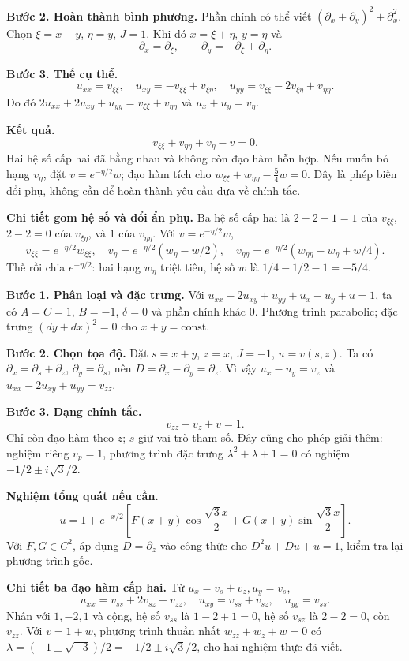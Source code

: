 \textbf{Bước 2. Hoàn thành bình phương.} Phần chính có thể viết $(\partial_x+\partial_y)^2+\partial_x^2$. Chọn $\xi=x-y$, $\eta=y$, $J=1$. Khi đó $x=\xi+\eta$, $y=\eta$ và
\[\partial_x=\partial_\xi,\qquad\partial_y=-\partial_\xi+\partial_\eta.\]

\textbf{Bước 3. Thế cụ thể.}
\[u_{xx}=v_{\xi\xi},\quad u_{xy}=-v_{\xi\xi}+v_{\xi\eta},\quad
u_{yy}=v_{\xi\xi}-2v_{\xi\eta}+v_{\eta\eta}.\]
Do đó $2u_{xx}+2u_{xy}+u_{yy}=v_{\xi\xi}+v_{\eta\eta}$ và $u_x+u_y=v_\eta$.

\textbf{Kết quả.}
\[\boxed{v_{\xi\xi}+v_{\eta\eta}+v_\eta-v=0.}\]
Hai hệ số cấp hai đã bằng nhau và không còn đạo hàm hỗn hợp. Nếu muốn bỏ hạng $v_\eta$, đặt $v=e^{-\eta/2}w$; đạo hàm tích cho $w_{\xi\xi}+w_{\eta\eta}-\tfrac54w=0$. Đây là phép biến đổi phụ, không cần để hoàn thành yêu cầu đưa về chính tắc.

\textbf{Chi tiết gom hệ số và đổi ẩn phụ.} Ba hệ số cấp hai là $2-2+1=1$ của $v_{\xi\xi}$, $2-2=0$ của $v_{\xi\eta}$, và $1$ của $v_{\eta\eta}$. Với $v=e^{-\eta/2}w$,
\[v_{\xi\xi}=e^{-\eta/2}w_{\xi\xi},\quad v_\eta=e^{-\eta/2}(w_\eta-w/2),\quad
v_{\eta\eta}=e^{-\eta/2}(w_{\eta\eta}-w_\eta+w/4).\]
Thế rồi chia $e^{-\eta/2}$: hai hạng $w_\eta$ triệt tiêu, hệ số $w$ là $1/4-1/2-1=-5/4$.

\textbf{Bước 1. Phân loại và đặc trưng.} Với $u_{xx}-2u_{xy}+u_{yy}+u_x-u_y+u=1$, ta có $A=C=1$, $B=-1$, $\delta=0$ và phần chính khác $0$. Phương trình parabolic; đặc trưng $(dy+dx)^2=0$ cho $x+y=\mathrm{const}$.

\textbf{Bước 2. Chọn tọa độ.} Đặt $s=x+y$, $z=x$, $J=-1$, $u=v(s,z)$. Ta có $\partial_x=\partial_s+\partial_z$, $\partial_y=\partial_s$, nên $D=\partial_x-\partial_y=\partial_z$. Vì vậy $u_x-u_y=v_z$ và $u_{xx}-2u_{xy}+u_{yy}=v_{zz}$.

\textbf{Bước 3. Dạng chính tắc.}
\[\boxed{v_{zz}+v_z+v=1.}\]
Chỉ còn đạo hàm theo $z$; $s$ giữ vai trò tham số. Đây cũng cho phép giải thêm: nghiệm riêng $v_p=1$, phương trình đặc trưng $\lambda^2+\lambda+1=0$ có nghiệm $-1/2\pm i\sqrt3/2$.

\textbf{Nghiệm tổng quát nếu cần.}
\[u=1+e^{-x/2}\left[F(x+y)\cos\frac{\sqrt3x}{2}+G(x+y)\sin\frac{\sqrt3x}{2}\right].\]
Với $F,G\in C^2$, áp dụng $D=\partial_z$ vào công thức cho $D^2u+Du+u=1$, kiểm tra lại phương trình gốc.

\textbf{Chi tiết ba đạo hàm cấp hai.} Từ $u_x=v_s+v_z,u_y=v_s$,
\[u_{xx}=v_{ss}+2v_{sz}+v_{zz},\quad u_{xy}=v_{ss}+v_{sz},\quad u_{yy}=v_{ss}.\]
Nhân với $1,-2,1$ và cộng, hệ số $v_{ss}$ là $1-2+1=0$, hệ số $v_{sz}$ là $2-2=0$, còn $v_{zz}$. Với $v=1+w$, phương trình thuần nhất $w_{zz}+w_z+w=0$ có $\lambda=(-1\pm\sqrt{-3})/2=-1/2\pm i\sqrt3/2$, cho hai nghiệm thực đã viết.

